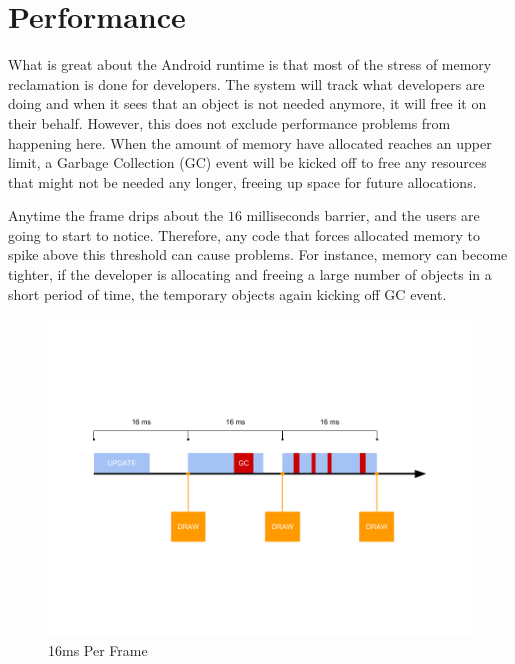 \label{chapter-performance}
\chapter{Performance}

What is great about the Android runtime is that most of the stress of memory reclamation is done for developers. The system will track what developers are doing and when it sees that an object is not needed anymore, it will free it on their behalf. However, this does not exclude performance problems from happening here. When the amount of memory have allocated reaches an upper limit, a Garbage Collection (GC) event will be kicked off to free any resources that might not be needed any longer, freeing up space for future allocations. 

Anytime the frame drips about the $16$ milliseconds barrier, and the users are going to start to notice. Therefore, any code that forces allocated memory to spike above this threshold can cause problems. For instance, memory can become tighter, if the developer is allocating and freeing a large number of objects in a short period of time, the temporary objects again kicking off GC event. 

\begin{figure}[H]
\caption{16ms Per Frame}
\label{fig:16ms-per-frame}
\centering
\includegraphics[width=\textwidth, keepaspectratio]{Figures/16ms-per-frame.png}
\decoRule
\end{figure}

